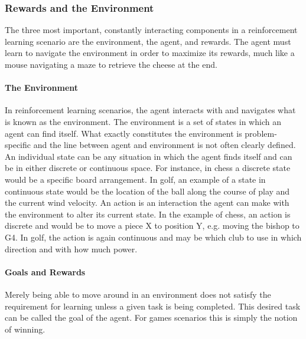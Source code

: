 \subsubsection*{Rewards and the Environment}


The three most important, constantly interacting components in a reinforcement
learning scenario are
the environment, the agent, and rewards.
%
The agent must learn to navigate the environment in order to maximize its
rewards,
much like a mouse navigating a maze to retrieve the cheese at the end.

\paragraph*{The Environment}

In reinforcement learning scenarios,
the agent interacts with and navigates what is known as the environment.
%
The environment is a set of states in which an agent can find itself.
%
What exactly constitutes the environment is problem-specific
and the line between agent and environment is not often clearly defined.
%
An individual state can be any situation in which the agent finds itself
and can be in either discrete or continuous space.
%
For instance, in chess a discrete state would be a specific board arrangement.
%
In golf, an example of a state in continuous state would be 
the location of the ball along the course of play
and the current wind velocity.
%
An action is an interaction the agent can make with the environment to alter
its current state.
%
In the example of chess,
an action is discrete and would be to move a piece X to position Y,
e.g. moving the bishop to G4.
%
In golf, the action is again continuous and may be
which club to use in which direction and with how much power.

\paragraph*{Goals and Rewards}

Merely being able to move around in an environment does not satisfy the
requirement for learning unless a given task is being completed.
%
This desired task can be called the goal of the agent.
%
For games scenarios
this is simply the notion of winning.

